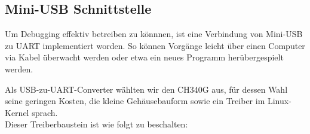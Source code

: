 \newpage

\subsection{Mini-USB Schnittstelle}

Um Debugging effektiv betreiben zu könnnen, ist eine Verbindung von Mini-USB zu UART implementiert worden.
So können Vorgänge leicht über einen Computer via Kabel überwacht werden oder etwa ein neues Programm herübergespielt werden.

Als USB-zu-UART-Converter wählten wir den CH340G aus, für dessen Wahl seine geringen Kosten, die kleine Gehäusebauform sowie ein Treiber im Linux-Kernel sprach.\\
Dieser Treiberbaustein ist wie folgt zu beschalten:

